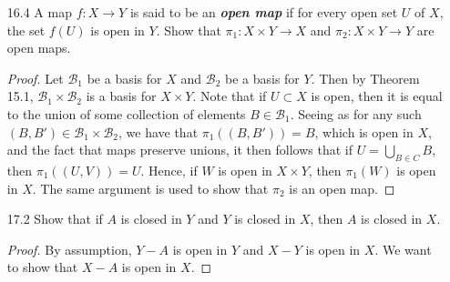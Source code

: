 \documentclass[12pt]{article}
\theoremstyle{definition}
\begin{document}
\begin{enumerate}
\begin{proof}
                Seeing as $x\in(T\cap U)$, then there exists
                $\hat{B}\in\mathcal{B}$ such that $x\in\hat{B}\subset T\cap U$.
                It follows that $x\in\hat{B}\cap A\subset B\cap B'\subset
                B$. Hence, $\mathcal{T}_2\subset\mathcal{T}_3$. The other
                inclusion is shown in a similar way, and so we can conclude
                that $\mathcal{T}_2=\mathcal{T}_3$.
            \end{proof}
        \item[16.4] A map $f:X\to Y$ is said to be an \textbf{\textit{open
            map}} if for every open set $U$ of $X$, the set $f(U)$ is open in
            $Y$. Show that $\pi_1:X\times Y\to X$ and $\pi_2:X\times Y\to Y$
            are open maps.
            \begin{proof}
                Let $\mathcal{B}_1$ be a basis for $X$ and $\mathcal{B}_2$ be
                a basis for $Y$. Then by Theorem 15.1,
                $\mathcal{B}_1\times\mathcal{B}_2$ is a basis for $X\times Y$.
                Note that if $U\subset X$ is open, then it is equal to the
                union of some collection of elements $B\in\mathcal{B}_1$.
                Seeing as for any such $(B,
                B')\in\mathcal{B}_1\times\mathcal{B}_2$, we have that
                $\pi_1((B, B'))=B$, which is open in $X$, and the fact that
                maps preserve unions, it then follows that if $U=\bigcup_{B\in
                C}B$, then $\pi_1((U, V))=U$. Hence, if $W$ is open in $X\times
                Y$, then $\pi_1(W)$ is open in $X$. The same argument is used
                to show that $\pi_2$ is an open map.
            \end{proof}
        \item[17.2] Show that if $A$ is closed in $Y$ and $Y$ is closed in $X$,
            then $A$ is closed in $X$.
            \begin{proof}
                By assumption, $Y-A$ is open in $Y$ and $X-Y$ is open in $X$.
                We want to show that $X-A$ is open in $X$.
            \end{proof}
    \end{enumerate}
\end{document}
